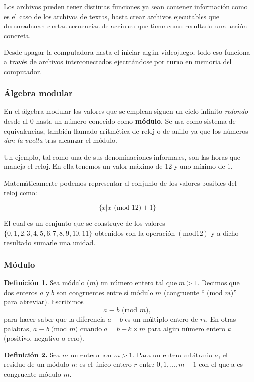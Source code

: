 \documentclass[a4paper]{article}
\begin{document}
Los archivos pueden tener distintas funciones ya sean contener información como es el caso de los archivos de textos, hasta crear archivos ejecutables que desencadenan ciertas secuencias de acciones que tiene como resultado una acción concreta.


Desde apagar la computadora hasta el iniciar algún videojuego, todo eso funciona a través de archivos interconectados ejecutándose por turno en memoria del computador.

\autocite{ARCHIVO}

\subsubsection{Álgebra modular}

En el álgebra modular los valores que se emplean siguen un ciclo infinito \textit{redondo} desde al 0 hasta un número conocido como \textbf{módulo}. Se usa como sistema de equivalencias, también llamado aritmética de reloj o de anillo ya que los números \textit{dan la vuelta} tras alcanzar el módulo.

\autocite{wikimod}

Un ejemplo, tal como una de sus denominaciones informales, son las horas que maneja el reloj. En ella tenemos un valor máximo de 12 y uno mínimo de 1.

Matemáticamente podemos representar el conjunto de los valores posibles del reloj como:

\[
\{x | x \text{ (mod }12\text{)} + 1\}
\]

El cual es un conjunto que se construye de los valores $\{0,1,2,3,4,5,6,7,8,9,10,11\}$ obtenidos con la operación $(\text{mod} 12)$ y a dicho resultado sumarle una unidad.

\subsubsection{Módulo}

\textbf{Definición 1.} Sea módulo ($m$) un número entero tal que $m > 1$. Decimos que dos enteros $a$ y $b$ son congruentes entre sí módulo $m$ (congruente “$\text{ (mod }m\text{)}$” para abreviar). Escribimos
\[a \equiv b \text{ (mod }m\text{)},\]
para hacer saber que la diferencia $a - b$ es un múltiplo entero de $m$. En otras palabras, $a \equiv b \text{ (mod }m\text{)}$ cuando $a = b + k \times m$ para algún número entero $k$ (positivo, negativo o cero).

\textbf{Definición 2.} Sea $m$ un entero con $m > 1$. Para un entero arbitrario $a$, el residuo de un módulo $m$ es el único entero $r$ entre $0,1,...,m-1$ con el que a es congruente módulo $m$.
\end{document}
